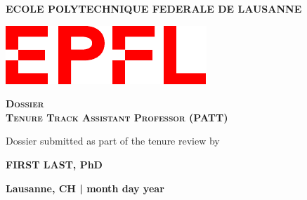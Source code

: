 \documentclass[11pt, notitlepage]{report}
\begin{document}
\begin{titlepage}
	\centering
	{\textbf{ECOLE POLYTECHNIQUE FEDERALE DE LAUSANNE}} \par
	\vspace{1 cm}
    \vspace{1 cm}
	\includegraphics[scale=0.6]{Figures/Logo_EPFL.pdf}\par\vspace{1cm}
  
	\vspace{1cm}
	{\scshape\Large\textbf{Dossier \\ Tenure Track Assistant Professor (PATT)}\par}
	\vspace{1 cm}

    
Dossier submitted as part of the tenure review by
    \vspace{0.5 cm}
    
	{\large\textbf{FIRST LAST, PhD}\par}
	

	\vspace{12 cm}
	{\large \textbf{Lausanne, CH | month day year}\par}
\end{titlepage}




{\hypersetup{linkcolor=black}
\tableofcontents
}




\end{document}
